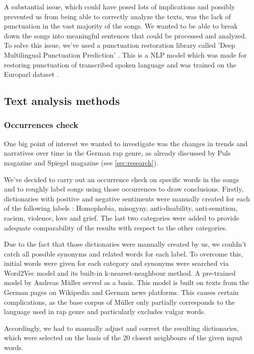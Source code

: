 A substantial issue, which could have posed lots of implications and possibly prevented us from being able to correctly analyze the texts, was the lack of punctuation in the vast majority of the songs. We wanted to be able to break down the songs into meaningful sentences that could be processed and analyzed. To solve this issue, we've used a punctuation restoration library called 'Deep Multilingual Punctuation Prediction' \cite{auto-punctuation}. This is a NLP model which was made for restoring punctuation of transcribed spoken language and was trained on the Europarl dataset \cite{europarl}.

\subsection*{Text analysis methods}

\subsubsection*{Occurrences check}

One big point of interest we wanted to investigate was the changes in trends and narratives over time in the German rap genre, as already discussed by Puls magazine and Spiegel magazine (see \autoref{sec:research}).

We've decided to carry out an occurrence check on specific words in the songs and to roughly label songs using those occurrences to draw conclusions. Firstly, dictionaries with positive and negative sentiments were manually created for each of the following labels : Homophobia, misogyny, anti-disability, anti-semitism, racism, violence, love and grief. The last two categories were added to provide adequate comparability of the results with respect to the other categories.

Due to the fact that those dictionaries were manually created by us, we couldn't catch all possible synonyms and related words for each label. To overcome this, initial words were given for each category and synonyms were searched via Word2Vec model and its built-in k-nearest-neaghbour method. A pre-trained model by Andreas Müller \cite{mueller2015} served as a basis. This model is built on texts from the German pages on Wikipedia and German news platforms. This causes certain complications, as the base corpus of Müller only partially corresponds to the language used in rap genre and particularly excludes vulgar words.

Accordingly, we had to manually adjust and correct the resulting dictionaries, which were selected on the basis of the 20 closest neighbours of the given input words. 

